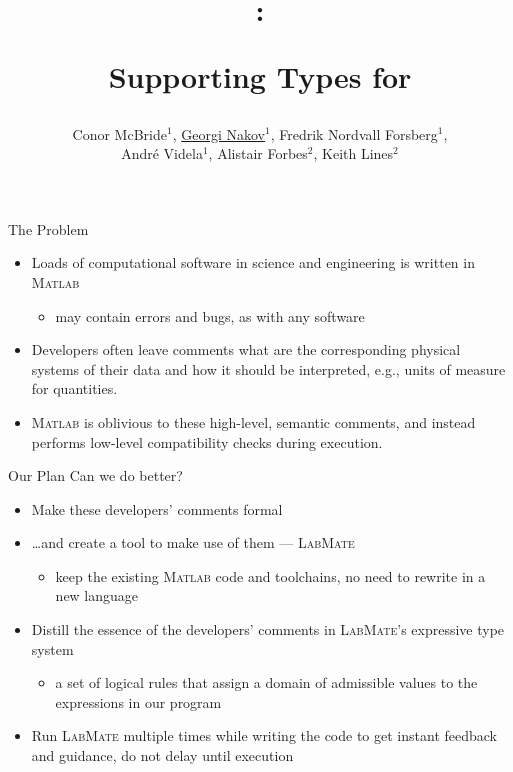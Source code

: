 \documentclass[]{beamer}
\title{\huge \lm: \\ \centerline{Supporting Types for \ma} }
\author[McBride, Nakov, Nordvall Forsberg et al]{\small Conor McBride$^{1}$, \underline{Georgi Nakov}$^{1}$, Fredrik Nordvall Forsberg$^{1}$,\\ Andr\'e Videla$^{1}$, Alistair Forbes$^{2}$, Keith Lines$^{2}$}
\institute[]{$^{1}$University of Strathclyde, UK\\$^{2}$National Physical Laboratory, UK}
\newcommand{\lm}{\textsc{LabMate}\xspace}
\newcommand{\ma}{\textsc{Matlab}\xspace}
\begin{document}
\begin{frame}
  \titlepage
\end{frame}

\begin{frame}{The Problem}
  \begin{itemize}
  \item Loads of computational software in science and engineering is
    written in \ma
    \begin{itemize}
    \item may contain errors and bugs, as with any software
    \end{itemize}
  \item Developers often leave comments what are the corresponding
    physical systems of their data and how it should be interpreted,
    e.g., units of measure for quantities.
  \item \ma is oblivious to these high-level, semantic comments, and
    instead performs low-level compatibility checks during execution.
  \end{itemize}
\end{frame}

\begin{frame}{Our Plan}
  Can we do better?
  \begin{itemize}
  \item Make these developers' comments formal
  \item \ldots and create a tool to make use of them --- \lm
    \begin{itemize}
    \item keep the existing \ma code and toolchains, no need to
      rewrite in a new language
    \end{itemize}
  \item Distill the essence of the developers' comments in
    \lm's expressive type system
    \begin{itemize}
    \item a set of logical rules that assign a domain of admissible
      values to the expressions in our program
    \end{itemize}
  \item Run \lm multiple times while writing the code to get instant
    feedback and guidance, do not delay until execution
  \end{itemize}
\end{frame}
\end{document}
